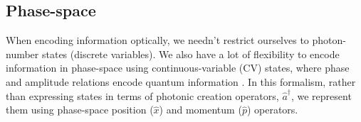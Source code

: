 %
%

\subsection{Phase-space} \label{sec:exotic} 

When encoding information optically, we needn't restrict ourselves to photon-number states (discrete variables). We also have a lot of flexibility to encode information in phase-space using continuous-variable (CV) states, where phase and amplitude relations encode quantum information \cite{bib:CahillGlauber69}. In this formalism, rather than expressing states in terms of photonic creation operators, $\hat{a}^\dag$, we represent them using phase-space position ($\hat{x}$) and momentum ($\hat{p}$) operators.

